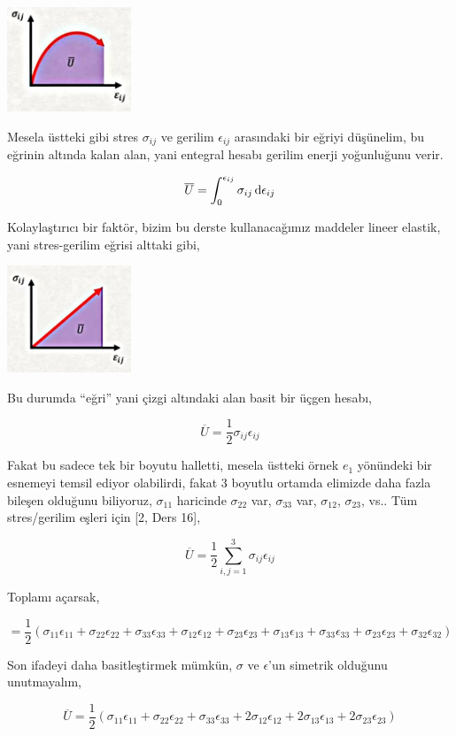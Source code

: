 \documentclass[12pt,fleqn]{article}\usepackage{../../common}
\begin{document}
\includegraphics[width=10em]{phy_020_strs_04_04.jpg}

Mesela üstteki gibi stres $\sigma_{ij}$ ve gerilim $\epsilon_{ij}$ arasındaki
bir eğriyi düşünelim, bu eğrinin altında kalan alan, yani entegral hesabı 
gerilim enerji yoğunluğunu verir.

$$
\overline{U} = \int_{0}^{\epsilon_{ij}} \sigma_{ij} \,\mathrm{d} \epsilon_{ij}
$$

Kolaylaştırıcı bir faktör, bizim bu derste kullanacağımız maddeler lineer
elastik, yani stres-gerilim eğrisi alttaki gibi,

\includegraphics[width=10em]{phy_020_strs_04_05.jpg}

Bu durumda ``eğri'' yani çizgi altındaki alan basit bir üçgen hesabı,

$$
\overline{U} = \frac{1}{2} \sigma_{ij} \epsilon_{ij}
$$

Fakat bu sadece tek bir boyutu halletti, mesela üstteki örnek $e_1$ yönündeki
bir esnemeyi temsil ediyor olabilirdi, fakat 3 boyutlu ortamda elimizde daha
fazla bileşen olduğunu biliyoruz, $\sigma_{11}$ haricinde $\sigma_{22}$ var,
$\sigma_{33}$ var, $\sigma_{12}$, $\sigma_{23}$, vs.. Tüm stres/gerilim
eşleri için [2, Ders 16],

$$
\overline{U} = \frac{1}{2} \sum_{i,j=1}^{3} \sigma_{ij} \epsilon_{ij}
$$

Toplamı açarsak,

$$
= \frac{1}{2} (\sigma_{11}\epsilon_{11} + \sigma_{22}\epsilon_{22}  +
\sigma_{33}\epsilon_{33} + \sigma_{12}\epsilon_{12} + \sigma_{23}\epsilon_{23} +
\sigma_{13}\epsilon_{13} + \sigma_{33}\epsilon_{33} + \sigma_{23}\epsilon_{23} +
\sigma_{32}\epsilon_{32} )
$$

Son ifadeyi daha basitleştirmek mümkün, $\sigma$ ve $\epsilon$'un simetrik
olduğunu unutmayalım,

$$
\overline{U} = \frac{1}{2} (\sigma_{11}\epsilon_{11} + \sigma_{22}\epsilon_{22}  +
\sigma_{33}\epsilon_{33} + 2 \sigma_{12}\epsilon_{12} +
2 \sigma_{13}\epsilon_{13} + 2 \sigma_{23}\epsilon_{23} )
$$
\end{document}
